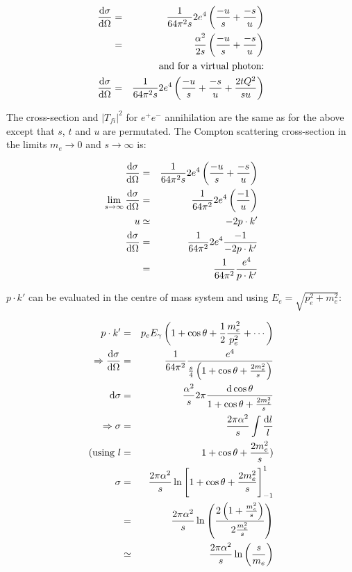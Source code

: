 \begin{eqnarray*}
  \frac{\mathrm{d}\sigma}{\mathrm{d}\Omega} & = & \frac{1}{64\pi^2 s}2e^4\left(\frac{-u}{s} + \frac{-s}{u}\right) \\
  & = & \frac{\alpha^2}{2s}\left(\frac{-u}{s} + \frac{-s}{u}\right) \\
  && \textrm{and for a virtual photon:} \\
  \frac{\mathrm{d}\sigma}{\mathrm{d}\Omega} & = & \frac{1}{64\pi^2s}2e^4\left(\frac{-u}{s} + \frac{-s}{u} + \frac{2tQ^2}{su}\right)
\end{eqnarray*}

The cross-section and $|T_{fi}|^2$ for $e^+e^-$ annihilation are the same as for the above except that $s$, $t$ and $u$ are permutated.  The Compton scattering cross-section in the limits $m_e \to 0$ and $s \to \infty$ is:

\begin{eqnarray*}
  \frac{\mathrm{d}\sigma}{\mathrm{d}\Omega} & = & \frac{1}{64\pi^2s}2e^4\left(\frac{-u}{s} + \frac{-s}{u}\right) \\
  \lim_{s\to\infty} \frac{\mathrm{d}\sigma}{\mathrm{d}\Omega} & = & \frac{1}{64\pi^2}2e^4\left(\frac{-1}{u}\right) \\
  u & \simeq & -2p\cdot k' \\
  \frac{\mathrm{d}\sigma}{\mathrm{d}\Omega} & = & \frac{1}{64\pi^2}2e^4\frac{-1}{-2p\cdot k'} \\
  & = & \frac{1}{64\pi^2}\frac{e^4}{p\cdot k'}
\end{eqnarray*}

$p\cdot k'$ can be evaluated in the centre of mass system and using $E_e = \sqrt{p_e^2 + m_e^2}$:

\begin{eqnarray*}
  p\cdot k' & = & p_eE_{\gamma}\left(1 + \cos\theta + \frac{1}{2}\frac{m_e^2}{p_e^2} + \cdots \right) \\
  \Rightarrow \frac{\mathrm{d}\sigma}{\mathrm{d}\Omega} & = & \frac{1}{64\pi^2}\frac{e^4}{\frac{s}{4}\left(1 + \cos\theta + \frac{2m_e^2}{s}\right)} \\
  \mathrm{d}\sigma & = & \frac{\alpha^2}{s}2\pi\frac{\mathrm{d}\cos\theta}{1 + \cos\theta + \frac{2m_e^2}{s}} \\
  \Rightarrow \sigma & = & \frac{2\pi\alpha^2}{s}\int\frac{\mathrm{d}l}{l} \\
  \textrm{(using } l & = & 1 + \cos\theta + \frac{2m_e^2}{s} \textrm{)} \\
  \sigma & = & \frac{2\pi\alpha^2}{s}\ln\Bigg[1 + \cos\theta + \frac{2m_e^2}{s}\Bigg]_{-1}^{1} \\
  & = & \frac{2\pi\alpha^2}{s}\ln\left(\frac{2\left(1 + \frac{m_e^2}{s}\right)}{2\frac{m_e^2}{s}}\right) \\
  & \simeq & \frac{2\pi\alpha^2}{s}\ln\left(\frac{s}{m_e}\right)
\end{eqnarray*}
